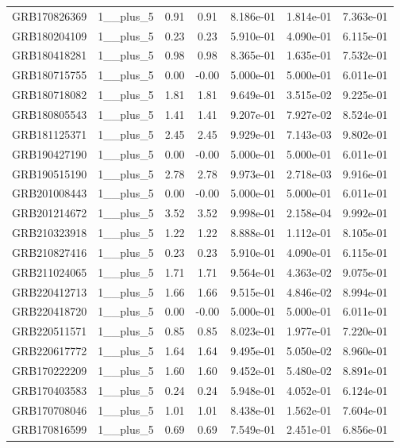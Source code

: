 \documentclass[12pt]{article}
\begin{document}
\begin{table}[h!]
{\begin{tabular}{l c c c c c c}
GRB170826369 & 1__plus_5 & 0.91 & 0.91 & 8.186e-01 & 1.814e-01 & 7.363e-01 \\
GRB180204109 & 1__plus_5 & 0.23 & 0.23 & 5.910e-01 & 4.090e-01 & 6.115e-01 \\
GRB180418281 & 1__plus_5 & 0.98 & 0.98 & 8.365e-01 & 1.635e-01 & 7.532e-01 \\
GRB180715755 & 1__plus_5 & 0.00 & -0.00 & 5.000e-01 & 5.000e-01 & 6.011e-01 \\
GRB180718082 & 1__plus_5 & 1.81 & 1.81 & 9.649e-01 & 3.515e-02 & 9.225e-01 \\
GRB180805543 & 1__plus_5 & 1.41 & 1.41 & 9.207e-01 & 7.927e-02 & 8.524e-01 \\
GRB181125371 & 1__plus_5 & 2.45 & 2.45 & 9.929e-01 & 7.143e-03 & 9.802e-01 \\
GRB190427190 & 1__plus_5 & 0.00 & -0.00 & 5.000e-01 & 5.000e-01 & 6.011e-01 \\
GRB190515190 & 1__plus_5 & 2.78 & 2.78 & 9.973e-01 & 2.718e-03 & 9.916e-01 \\
GRB201008443 & 1__plus_5 & 0.00 & -0.00 & 5.000e-01 & 5.000e-01 & 6.011e-01 \\
GRB201214672 & 1__plus_5 & 3.52 & 3.52 & 9.998e-01 & 2.158e-04 & 9.992e-01 \\
GRB210323918 & 1__plus_5 & 1.22 & 1.22 & 8.888e-01 & 1.112e-01 & 8.105e-01 \\
GRB210827416 & 1__plus_5 & 0.23 & 0.23 & 5.910e-01 & 4.090e-01 & 6.115e-01 \\
GRB211024065 & 1__plus_5 & 1.71 & 1.71 & 9.564e-01 & 4.363e-02 & 9.075e-01 \\
GRB220412713 & 1__plus_5 & 1.66 & 1.66 & 9.515e-01 & 4.846e-02 & 8.994e-01 \\
GRB220418720 & 1__plus_5 & 0.00 & -0.00 & 5.000e-01 & 5.000e-01 & 6.011e-01 \\
GRB220511571 & 1__plus_5 & 0.85 & 0.85 & 8.023e-01 & 1.977e-01 & 7.220e-01 \\
GRB220617772 & 1__plus_5 & 1.64 & 1.64 & 9.495e-01 & 5.050e-02 & 8.960e-01 \\
GRB170222209 & 1__plus_5 & 1.60 & 1.60 & 9.452e-01 & 5.480e-02 & 8.891e-01 \\
GRB170403583 & 1__plus_5 & 0.24 & 0.24 & 5.948e-01 & 4.052e-01 & 6.124e-01 \\
GRB170708046 & 1__plus_5 & 1.01 & 1.01 & 8.438e-01 & 1.562e-01 & 7.604e-01 \\
GRB170816599 & 1__plus_5 & 0.69 & 0.69 & 7.549e-01 & 2.451e-01 & 6.856e-01 \\

\end{tabular}}
\end{table}
\end{document}
